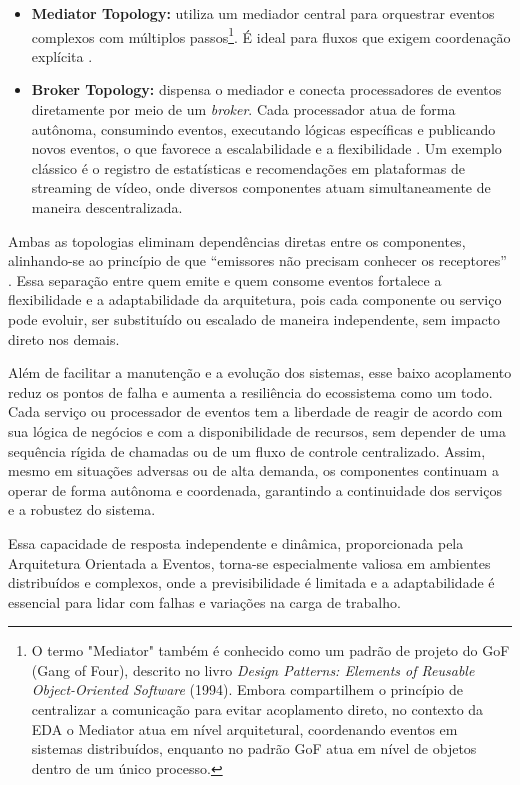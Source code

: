 \begin{itemize}
    \item \textbf{Mediator Topology:} utiliza um mediador central para orquestrar eventos complexos com múltiplos passos\footnote{O termo "Mediator" também é conhecido como um padrão de projeto do GoF (Gang of Four), descrito no livro \textit{Design Patterns: Elements of Reusable Object-Oriented Software} (1994). Embora compartilhem o princípio de centralizar a comunicação para evitar acoplamento direto, no contexto da EDA o Mediator atua em nível arquitetural, coordenando eventos em sistemas distribuídos, enquanto no padrão GoF atua em nível de objetos dentro de um único processo.}. É ideal para fluxos que exigem coordenação explícita \citep{10.5555/2904417}.

    
    \item \textbf{Broker Topology:} dispensa o mediador e conecta processadores de eventos diretamente por meio de um \textit{broker}. Cada processador atua de forma autônoma, consumindo eventos, executando lógicas específicas e publicando novos eventos, o que favorece a escalabilidade e a flexibilidade \citep{10.5555/2904417}. Um exemplo clássico é o registro de estatísticas e recomendações em plataformas de streaming de vídeo, onde diversos componentes atuam simultaneamente de maneira descentralizada.
\end{itemize}

Ambas as topologias eliminam dependências diretas entre os componentes, alinhando-se ao princípio de que “emissores não precisam conhecer os receptores” \citep{lazzari2021}. Essa separação entre quem emite e quem consome eventos fortalece a flexibilidade e a adaptabilidade da arquitetura, pois cada componente ou serviço pode evoluir, ser substituído ou escalado de maneira independente, sem impacto direto nos demais.

Além de facilitar a manutenção e a evolução dos sistemas, esse baixo acoplamento reduz os pontos de falha e aumenta a resiliência do ecossistema como um todo. Cada serviço ou processador de eventos tem a liberdade de reagir de acordo com sua lógica de negócios e com a disponibilidade de recursos, sem depender de uma sequência rígida de chamadas ou de um fluxo de controle centralizado. Assim, mesmo em situações adversas ou de alta demanda, os componentes continuam a operar de forma autônoma e coordenada, garantindo a continuidade dos serviços e a robustez do sistema.

Essa capacidade de resposta independente e dinâmica, proporcionada pela Arquitetura Orientada a Eventos, torna-se especialmente valiosa em ambientes distribuídos e complexos, onde a previsibilidade é limitada e a adaptabilidade é essencial para lidar com falhas e variações na carga de trabalho.

